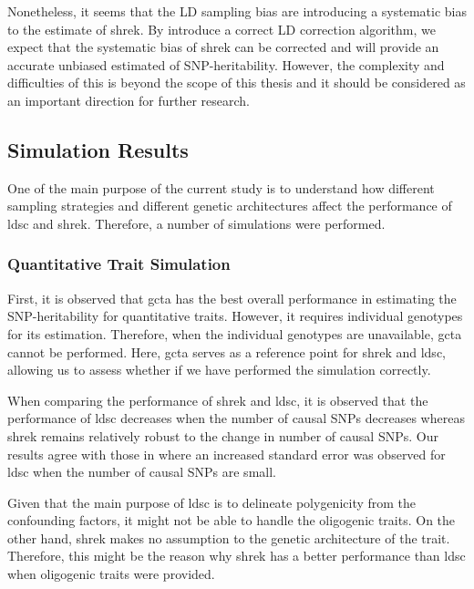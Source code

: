 \documentclass[12pt]{scrbook}
\begin{document}
Nonetheless, it seems that the \gls{LD} sampling bias are introducing a systematic bias to the estimate of \gls{shrek}.
By introduce a correct \gls{LD} correction algorithm, we expect that the systematic bias of \gls{shrek} can be corrected and will provide an accurate unbiased estimated of \gls{SNP}-heritability.
However, the complexity and difficulties of this is beyond the scope of this thesis and it should be considered as an important direction for further research. 

\subsection{Simulation Results}
One of the main purpose of the current study is to understand how different sampling strategies and different genetic architectures affect the performance of \gls{ldsc} and \gls{shrek}.
Therefore, a number of simulations were performed. 

\subsubsection{Quantitative Trait Simulation}
First, it is observed that \gls{gcta} has the best overall performance in estimating the \gls{SNP}-heritability for quantitative traits. 
However, it requires individual genotypes for its estimation. 
Therefore, when the individual genotypes are unavailable, \gls{gcta} cannot be performed. 
Here, \gls{gcta} serves as a reference point for \gls{shrek} and \gls{ldsc}, allowing us to assess whether if we have performed the simulation correctly. 

When comparing the performance of \gls{shrek} and \gls{ldsc}, it is observed that the performance of \gls{ldsc} decreases when the number of causal \glspl{SNP} decreases whereas \gls{shrek} remains relatively robust to the change in number of causal \glspl{SNP}. 
Our results agree with those in \citet{Bulik-Sullivan2015} where an increased standard error was observed for \gls{ldsc} when the number of causal \glspl{SNP} are small. 

Given that the main purpose of \gls{ldsc} is to delineate polygenicity from the confounding factors, it might not be able to handle the oligogenic traits. 
On the other hand, \gls{shrek} makes no assumption to the genetic architecture of the trait. 
Therefore, this might be the reason why \gls{shrek} has a better performance than \gls{ldsc} when oligogenic traits were provided. 
\end{document}
